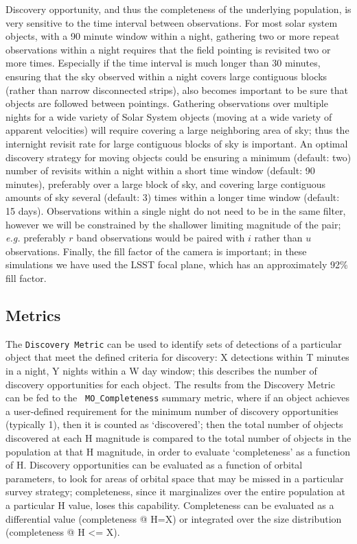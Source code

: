 Discovery opportunity, and thus the completeness of the underlying
population, is very sensitive to the time interval between
observations. For most solar system objects, with a 90 minute window
within a night, gathering two or more repeat observations within a night requires
that the field pointing is revisited two or more times. Especially if the time
interval is much longer than 30 minutes, ensuring that the sky
observed within a night covers large contiguous blocks (rather than
narrow disconnected strips), also becomes important to be sure that
objects are followed between pointings.  Gathering
observations over multiple nights for a wide variety of Solar System
objects (moving at a wide variety of apparent velocities) will require covering a large
neighboring area of sky; thus the internight revisit rate for large contiguous
blocks of sky is important. An optimal discovery strategy for moving
objects could be ensuring a minimum (default: two) number of revisits
within a night within a short time window (default: 90 minutes),
preferably over a large block of sky, and
covering large contiguous amounts of sky several (default: 3) times within a
longer time window (default: 15 days).  Observations within a single
night do not need to be in the same filter, however we will be
constrained by the shallower limiting magnitude of the pair; {\it e.g.}
preferably $r$ band observations would be paired with $i$ rather than
$u$ observations. Finally, the fill factor of the camera is important;
in these simulations we have used the LSST focal plane, which has an
approximately 92\% fill factor.


\subsection{Metrics}
\label{sec:\secname:metrics}

The {\tt Discovery Metric} can be used to identify sets of detections
of a particular object that meet the defined criteria for discovery: X
detections within T minutes in a night, Y nights within a W day
window; this describes the number of discovery opportunities for each object. The results from the Discovery Metric can be fed to the {\tt
  MO\_Completeness} summary metric, where if an object achieves a
user-defined requirement for the minimum number of discovery
opportunities (typically 1), then it is counted as `discovered'; then
the total number of objects discovered at each H magnitude is compared
to the total number of objects in the population at that H magnitude,
in order to evaluate `completeness' as a function of H. Discovery
opportunities can be evaluated as a function of orbital parameters, to
look for areas of orbital space that may be missed in a particular
survey strategy; completeness, since it marginalizes over the entire
population at a particular H value, loses this
capability. Completeness can be evaluated as a differential value
(completeness @ H=X) or integrated over the size distribution
(completeness @ H <= X).
 

